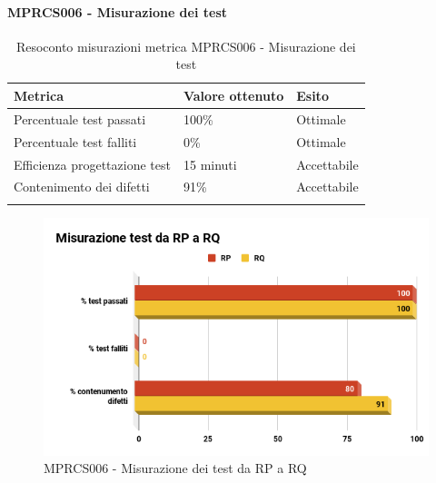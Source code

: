 \paragraph{MPRCS006 - Misurazione dei test}
\begin{center}
	\centering
	\renewcommand{\arraystretch}{1.5}
	\begin{longtable}{  p{5cm}  p{5cm} p{3cm}  }
		\rowcolor{tableHeadYellow}
		\textbf{Metrica}   & \textbf{Valore ottenuto} & \textbf{Esito} \\ 
		\endhead
		Percentuale test passati     & 100\%  & Ottimale \\
		Percentuale test falliti     & 0\% & Ottimale \\
		Efficienza progettazione test    & 15 minuti & Accettabile \\
		Contenimento dei difetti    & 91\% & Accettabile \\
		\rowcolor{white}
		\caption{Resoconto misurazioni metrica MPRCS006 - Misurazione dei test}
	\end{longtable}
\end{center}
\begin{figure}[H]
	\centering
	\includegraphics[width=13cm,keepaspectratio]{../includes/pics/Misurazione.png}
	\caption{\label{fig:mission}MPRCS006 - Misurazione dei test da RP a RQ}
\end{figure}
\pagebreak
